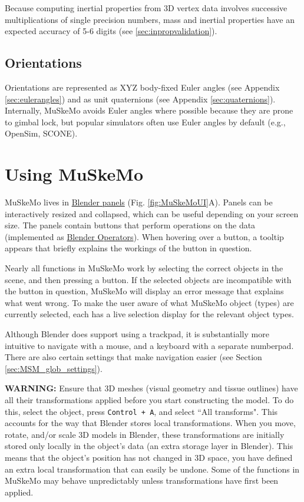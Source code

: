\documentclass{article}
\begin{document}
Because computing inertial properties from 3D vertex data involves successive multiplications of single precision numbers, mass and inertial properties have an expected accuracy of 5-6 digits (see \ref{sec:inpropvalidation}).

\subsection{Orientations}

Orientations are represented as XYZ body-fixed Euler angles (see Appendix \ref{sec:eulerangles}) and as unit quaternions (see Appendix \ref{sec:quaternions}). Internally, MuSkeMo avoids Euler angles where possible because they are prone to gimbal lock, but popular simulators often use Euler angles by default (e.g., OpenSim, SCONE).


\section{Using MuSkeMo}

MuSkeMo lives in \href{https://docs.blender.org/manual/en/latest/interface/window_system/tabs_panels.html}{Blender panels} (Fig. \ref{fig:MuSkeMoUI}A). Panels can be interactively resized and collapsed, which can be useful depending on your screen size. The panels contain buttons that perform operations on the data (implemented as \href{https://docs.blender.org/api/current/bpy.types.Operator.html}{Blender Operators}). When hovering over a button, a tooltip appears that briefly explains the workings of the button in question. 

Nearly all functions in MuSkeMo work by selecting the correct objects in the scene, and then pressing a button. If the selected objects are incompatible with the button in question, MuSkeMo will display an error message that explains what went wrong. To make the user aware of what MuSkeMo object (types) are currently selected, each has a live selection display for the relevant object types.


Although Blender does support using a trackpad, it is substantially more intuitive to navigate with a mouse, and a keyboard with a separate numberpad. There are also certain settings that make navigation easier (see Section \ref{sec:MSM_glob_settings}).


\textbf{WARNING:} Ensure that 3D meshes (visual geometry and tissue outlines) have all their transformations applied before you start constructing the model. To do this, select the object, press \texttt{Control + A}, and select ``All transforms". This accounts for the way that Blender stores local transformations. When you move, rotate, and/or scale 3D models in Blender, these transformations are initially stored only locally in the object's data (an extra storage layer in Blender). This means that the object's position has not changed in 3D space, you have defined an extra local transformation that can easily be undone. Some of the functions in MuSkeMo may behave unpredictably unless transformations have first been applied.
\end{document}
